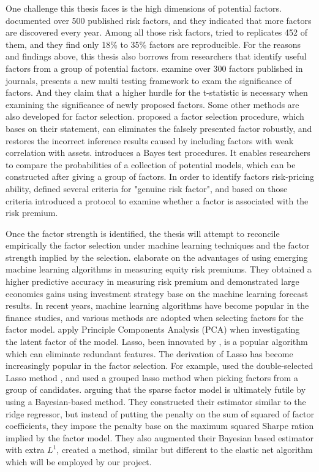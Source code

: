 One challenge this thesis faces is the high dimensions of potential factors.
 documented over 500 published risk factors, and they indicated that more factors are discovered every year.
Among all those risk factors,  tried to replicates 452 of them, and they find only 18\% to 35\% factors are reproducible.
For the reasons and findings above, this thesis also borrows from researchers that identify useful factors from a group of potential factors.
 examine over 300 factors published in journals, presents a new multi testing framework to exam the significance of factors.
And they claim that a higher hurdle for the t-statistic is necessary when examining the significance of newly proposed factors.
Some other methods are also developed for factor selection.
 proposed a factor selection procedure, which bases on their statement, can eliminates the falsely presented factor robustly, and restores the incorrect inference results caused by including factors with weak correlation with assets.
 introduces a Bayes test procedures.
It enables researchers to compare the probabilities of a collection of potential models, which can be constructed after giving a group of factors.
In order to identify factors risk-pricing ability,  defined several criteria for "genuine risk factor", and based on those criteria introduced a protocol to examine whether a factor is associated with the risk premium.

Once the factor strength is identified, the thesis will attempt to reconcile empirically the factor selection under machine learning techniques and the factor strength implied by the selection.
 elaborate on the advantages of using emerging machine learning algorithms in measuring equity risk premiums.
They obtained a higher predictive accuracy in measuring risk premium and demonstrated large economics gains using investment strategy base on the machine learning forecast results.
In recent years, machine learning algorithms have become popular in the finance studies, and various methods are adopted when selecting factors for the factor model.
 apply Principle Components Analysis (PCA) when investigating the latent factor of the model. 
Lasso, been innovated by , is a popular algorithm which can eliminate redundant features. 
The derivation of Lasso has become increasingly popular in the factor selection.
For example,  used the double-selected Lasso method \cite{Belloni2014}, and  used a grouped lasso method \cite{Huang2010} when picking factors from a group of candidates. 
 arguing that the sparse factor model is ultimately futile by using a Bayesian-based method. 
They constructed their estimator similar to the ridge regressor, but instead of putting the penalty on the sum of squared of factor coefficients, they impose the penalty base on the maximum squared Sharpe ration implied by the factor model.
They also augmented their Bayesian based estimator with extra $L^1$, created a method,  similar but different to the elastic net algorithm which will be employed by our project. 
